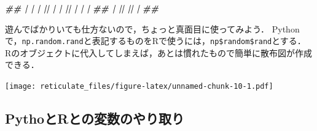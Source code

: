 \documentclass[
]{article}
\newenvironment{Shaded}{\begin{snugshade}}{\end{snugshade}}
\newcommand{\CommentTok}[1]{\textcolor[rgb]{0.56,0.35,0.01}{\textit{#1}}}
\newcommand{\DecValTok}[1]{\textcolor[rgb]{0.00,0.00,0.81}{#1}}
\newcommand{\DocumentationTok}[1]{\textcolor[rgb]{0.56,0.35,0.01}{\textbf{\textit{#1}}}}
\newcommand{\FunctionTok}[1]{\textcolor[rgb]{0.13,0.29,0.53}{\textbf{#1}}}
\newcommand{\NormalTok}[1]{#1}
\newcommand{\OtherTok}[1]{\textcolor[rgb]{0.56,0.35,0.01}{#1}}
\newcommand{\SpecialCharTok}[1]{\textcolor[rgb]{0.81,0.36,0.00}{\textbf{#1}}}
\newcommand{\StringTok}[1]{\textcolor[rgb]{0.31,0.60,0.02}{#1}}
\begin{document}
\begin{Shaded}
\begin{Highlighting}[]
\DocumentationTok{\#\# | |              | || |              | || |              | |}
\DocumentationTok{\#\# | \textquotesingle{}{-}{-}{-}{-}{-}{-}{-}{-}{-}{-}{-}{-}{-}{-}\textquotesingle{} || \textquotesingle{}{-}{-}{-}{-}{-}{-}{-}{-}{-}{-}{-}{-}{-}{-}\textquotesingle{} || \textquotesingle{}{-}{-}{-}{-}{-}{-}{-}{-}{-}{-}{-}{-}{-}{-}\textquotesingle{} |}
\DocumentationTok{\#\#  \textquotesingle{}{-}{-}{-}{-}{-}{-}{-}{-}{-}{-}{-}{-}{-}{-}{-}{-}\textquotesingle{}  \textquotesingle{}{-}{-}{-}{-}{-}{-}{-}{-}{-}{-}{-}{-}{-}{-}{-}{-}\textquotesingle{}  \textquotesingle{}{-}{-}{-}{-}{-}{-}{-}{-}{-}{-}{-}{-}{-}{-}{-}{-}\textquotesingle{} }
\end{Highlighting}
\end{Shaded}

遊んでばかりいても仕方ないので，ちょっと真面目に使ってみよう．
Pythonで，\texttt{np.random.rand}と表記するものをRで使うには，\texttt{np\$random\$rand}とする．
Rのオブジェクトに代入してしまえば，あとは慣れたもので簡単に散布図が作成できる．

\begin{Shaded}
\end{Shaded}

\texttt{[image: reticulate\_files/figure-latex/unnamed-chunk-10-1.pdf]}

\hypertarget{pythoux3068rux3068ux306eux5909ux6570ux306eux3084ux308aux53d6ux308a}{%
\subsection{PythoとRとの変数のやり取り}\label{pythoux3068rux3068ux306eux5909ux6570ux306eux3084ux308aux53d6ux308a}}
\end{document}
